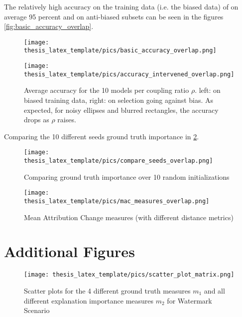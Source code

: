 The relatively high accuracy on the training data (i.e. the biased data) of on average 95 percent and on anti-biased subsets can be seen in the figures \cref{fig:basic_accuracy_overlap}.

\begin{figure}[!htb]
    \centering
    \begin{minipage}{0.49\textwidth}
    \texttt{[image: thesis\_latex\_template/pics/basic\_accuracy\_overlap.png]}
    \end{minipage}
    \begin{minipage}{0.49\textwidth}
    \texttt{[image: thesis\_latex\_template/pics/accuracy\_intervened\_overlap.png]}
    \end{minipage}
    \caption[Accuracy for Pattern Scenario]{Average accuracy for the 10 models per coupling ratio $\rho$. left: on biased training data, right: on selection going against bias. As expected, for noisy ellipses and blurred rectangles, the accuracy drops as $\rho$ raises.}
    \label{fig:accuracy_overlap}
\end{figure}

Comparing the 10 different seeds ground truth importance in \cref{fig:compare_seeds_overlap}.

\begin{figure}[!htb]
	\centering
	\label{fig:compare_seeds_overlap}
	\texttt{[image: thesis\_latex\_template/pics/compare\_seeds\_overlap.png]}
	\caption[Pattern Scenario Compare Seeds]{Comparing ground truth importance over 10 random initializations}
\end{figure}

\begin{figure}[!htb]
    \centering
    \texttt{[image: thesis\_latex\_template/pics/mac\_measures\_overlap.png]}
    \caption{Mean Attribution Change measures (with different distance metrics)  }
    \label{fig:mac_measures_overlap}
\end{figure}

\section{Additional Figures}

\begin{figure}[!htb]
	\centering
	\label{fig:some_more}
	\texttt{[image: thesis\_latex\_template/pics/scatter\_plot\_matrix.png]}
	\caption[Test]{Scatter plots for the 4 different ground truth measures $m_1$ and all different explanation importance measures $m_2$ for Watermark Scenario}
\end{figure}

